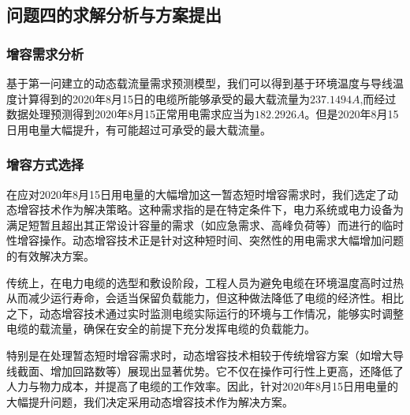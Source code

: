\documentclass[a4paper,12.045pt]{ctexart}
\begin{document}
	\subsection{问题四的求解分析与方案提出}
	\subsubsection{增容需求分析}
	基于第一问建立的动态载流量需求预测模型，我们可以得到基于环境温度与导线温度计算得到的2020年8月15日的电缆所能够承受的最大载流量为$237.1494A$,而经过数据处理预测得到2020年8月15正常用电需求应当为$182.2926A$。但是2020年8月15日用电量大幅提升，有可能超过可承受的最大载流量。
	\subsubsection{增容方式选择}
	在应对2020年8月15日用电量的大幅增加这一暂态短时增容需求时，我们选定了动态增容技术作为解决策略。这种需求指的是在特定条件下，电力系统或电力设备为满足短暂且超出其正常设计容量的需求（如应急需求、高峰负荷等）而进行的临时性增容操作。动态增容技术正是针对这种短时间、突然性的用电需求大幅增加问题的有效解决方案。
	\par
	传统上，在电力电缆的选型和敷设阶段，工程人员为避免电缆在环境温度高时过热从而减少运行寿命，会适当保留负载能力，但这种做法降低了电缆的经济性。相比之下，动态增容技术通过实时监测电缆实际运行的环境与工作情况，能够实时调整电缆的载流量，确保在安全的前提下充分发挥电缆的负载能力。
	\par
	特别是在处理暂态短时增容需求时，动态增容技术相较于传统增容方案（如增大导线截面、增加回路数等）展现出显著优势。它不仅在操作可行性上更高，还降低了人力与物力成本，并提高了电缆的工作效率。因此，针对2020年8月15日用电量的大幅提升问题，我们决定采用动态增容技术作为解决方案。
\end{document}
